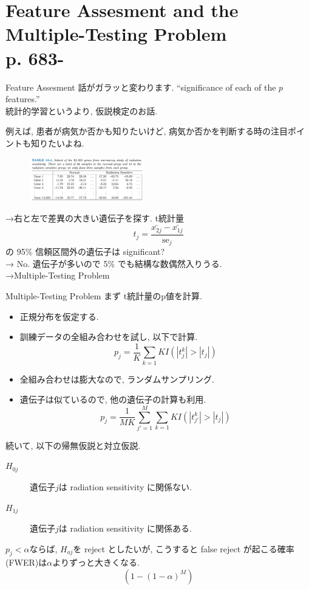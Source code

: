 \documentclass[dvipdfmx,8pt]{beamer}
\begin{document}
  \section{Feature Assesment and the Multiple-Testing Problem\\p. 683-}
  \begin{frame}{Feature Assesment}
    話がガラッと変わります. ``significance of each of the $p$ features.''\\
    統計的学習というより, 仮説検定のお話.

    例えば, 患者が病気か否かも知りたいけど, 病気か否かを判断する時の注目ポイントも知りたいよね.
    \begin{figure}[htb]
      \centering
      \includegraphics[width=5cm]{./images/radiation-data.png}
    \end{figure}
    →右と左で差異の大きい遺伝子を探す. t統計量
    \[
      t_j=\frac{\bar{x_{2j}}-\bar{x_{1j}}}{\mathrm{se}_j}
    \]
    の 95\% 信頼区間外の遺伝子は significant?\\
    → No. 遺伝子が多いので 5\% でも結構な数偶然入りうる. \\
    →Multiple-Testing Problem
  \end{frame}
  \begin{frame}{Multiple-Testing Problem}
    まず t統計量のp値を計算.
    \begin{itemize}
      \item 正規分布を仮定する.
      \item 訓練データの全組み合わせを試し, 以下で計算.
        \[
          p_j=\frac{1}{K}\sum_{k=1}{K}I(|t_j^k|>|t_j|)
        \]
      \item 全組み合わせは膨大なので, ランダムサンプリング.
      \item 遺伝子は似ているので, 他の遺伝子の計算も利用.
        \[
          p_j=\frac{1}{MK}\sum_{j'=1}^M\sum_{k=1}{K}I(|t_{j'}^k|>|t_j|)
        \]
    \end{itemize}
    続いて, 以下の帰無仮説と対立仮説.
    \begin{description}
      \item[$H_{0j}$] 遺伝子$j$は radiation sensitivity に関係ない.
      \item[$H_{1j}$] 遺伝子$j$は radiation sensitivity に関係ある.
    \end{description}
    $p_j<\alpha$ならば, $H_{oj}$を reject としたいが, こうすると false reject が起こる確率(FWER)は$\alpha$よりずっと大きくなる.
    \[
      (1-(1-\alpha)^M)
    \]
  \end{frame}
\end{document}
